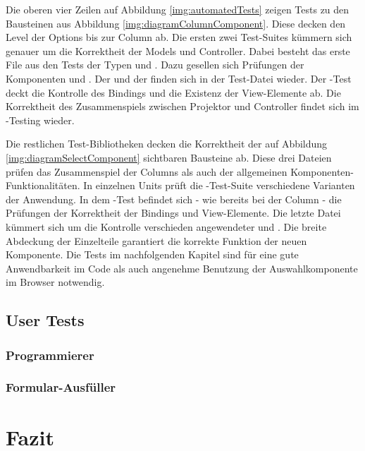 Die oberen vier Zeilen auf Abbildung \ref{img:automatedTests} zeigen Tests zu den Bausteinen aus Abbildung \ref{img:diagramColumnComponent}. 
Diese decken den Level der Options bis zur Column ab.
Die ersten zwei Test-Suites kümmern sich genauer um die Korrektheit der Models und Controller. 
Dabei besteht das erste File aus den Tests der Typen  und . 
Dazu gesellen sich Prüfungen der Komponenten  und .
Der  und der  finden sich in der Test-Datei wieder.
Der -Test deckt die Kontrolle des Bindings und die Existenz der View-Elemente ab.
Die Korrektheit des Zusammenspiels zwischen Projektor und Controller findet sich im -Testing wieder.

Die restlichen Test-Bibliotheken decken die Korrektheit der auf Abbildung \ref{img:diagramSelectComponent} sichtbaren Bausteine ab. 
Diese drei Dateien prüfen das Zusammenspiel der Columns als auch der allgemeinen Komponenten-Funktionalitäten. 
In einzelnen Units prüft die -Test-Suite verschiedene Varianten der Anwendung.
In dem -Test befindet sich - wie bereits bei der Column - die Prüfungen der Korrektheit der Bindings und View-Elemente. 
Die letzte Datei kümmert sich um die Kontrolle verschieden angewendeter  und . 
Die breite Abdeckung der Einzelteile garantiert die korrekte Funktion der neuen Komponente.
Die Tests im nachfolgenden Kapitel sind für eine gute Anwendbarkeit im Code als auch angenehme Benutzung der Auswahlkomponente im Browser notwendig. 


\subsection{User Tests} %
\label{sec:userTests}


\subsubsection{Programmierer}
\label{sec:userTestsProgrammer}


\subsubsection{Formular-Ausfüller}
\label{sec:userTestsEnduser}



\section{Fazit}
\label{sec:summeryNew}

